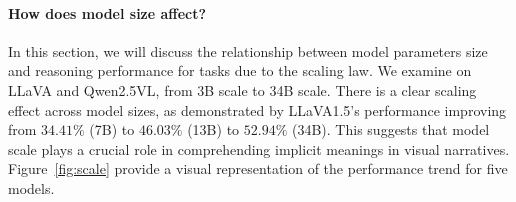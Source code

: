 


\paragraph{How does model size affect?}
In this section, we will discuss the relationship between model parameters size and reasoning performance for tasks due to the scaling law. We examine on LLaVA and Qwen2.5VL, from 3B scale to 34B scale.
There is a clear scaling effect across model sizes, as demonstrated by LLaVA1.5's performance improving from $34.41\%$ (7B) to $46.03\%$ (13B) to $52.94\%$ (34B). This suggests that model scale plays a crucial role in comprehending implicit meanings in visual narratives.
Figure~\ref{fig:scale} provide a visual representation of the performance trend for five models.

